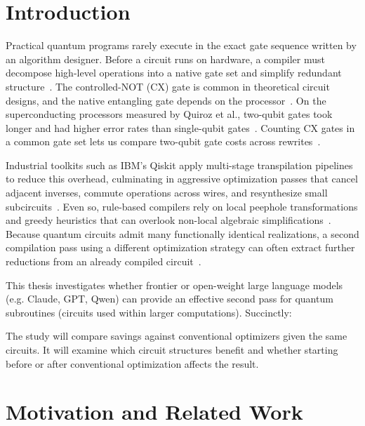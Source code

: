 \documentclass[12pt]{article}
\begin{document}

\section{Introduction}

Practical quantum programs rarely execute in the exact gate sequence written by an algorithm designer. Before a circuit runs on hardware, a compiler must decompose high-level operations into a native gate set and simplify redundant structure~\cite{zilk}. The controlled-NOT (CX) gate is common in theoretical circuit designs, and the native entangling gate depends on the processor~\cite{ashhab}. On the superconducting processors measured by Quiroz et al., two-qubit gates took longer and had higher error rates than single-qubit gates~\cite{quiroz-hardware}. Counting CX gates in a common gate set lets us compare two-qubit gate costs across rewrites~\cite{tket}.

Industrial toolkits such as IBM's Qiskit apply multi-stage transpilation pipelines to reduce this overhead, culminating in aggressive optimization passes that cancel adjacent inverses, commute operations across wires, and resynthesize small subcircuits~\cite{qiskit-code}. Even so, rule-based compilers rely on local peephole transformations and greedy heuristics that can overlook non-local algebraic simplifications~\cite{quartz}. Because quantum circuits admit many functionally identical realizations, a second compilation pass using a different optimization strategy can often extract further reductions from an already compiled circuit~\cite{quspect}.

This thesis investigates whether frontier or open-weight large language models (e.g. Claude, GPT, Qwen) can provide an effective second pass for quantum subroutines (circuits used within
larger computations). Succinctly:


The study will compare savings against conventional optimizers given the same circuits. It will examine which circuit structures benefit and whether starting before or after conventional optimization affects the result.

\section{Motivation and Related Work}
\end{document}

